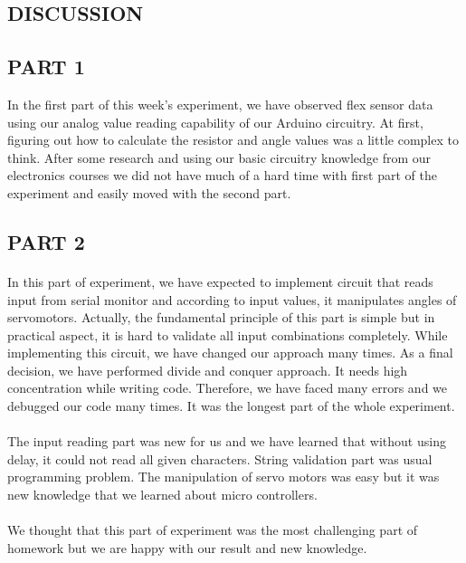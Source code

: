 \documentclass[pdftex,12pt,a4paper]{article}
\begin{document}
\begin{flushleft}
\newpage
\section{DISCUSSION}
\subsection{PART 1}
In the first part of this week's experiment, we have observed flex sensor data using our analog value reading capability of our Arduino circuitry. At first, figuring out how to calculate the resistor and angle values was a little complex to think. After some research and using our basic circuitry knowledge from our electronics courses we did not have much of a hard time with first part of the experiment and easily moved with the second part.


\subsection{PART 2} 
\paragraph{}
In this part of experiment, we have expected to implement circuit that reads input from serial monitor and according to input values, it manipulates angles of servomotors. Actually, the fundamental principle of this part is simple but in practical aspect, it is hard to validate all input combinations completely. While implementing this circuit, we have changed our approach many times. As a final decision, we have performed divide and conquer approach. It needs high concentration while writing code. Therefore, we have faced many errors and we debugged our code many times. It was the longest part of the whole experiment.
\paragraph{}
The input reading part was new for us and we have learned that without using delay, it could not read all given characters. String validation part was usual programming problem. The manipulation of servo motors was easy but it was new knowledge that we learned about micro controllers.
\paragraph{}
We thought that this part of experiment was the most challenging part of homework but we are happy with our result and new knowledge.


\end{flushleft}
\end{document}
